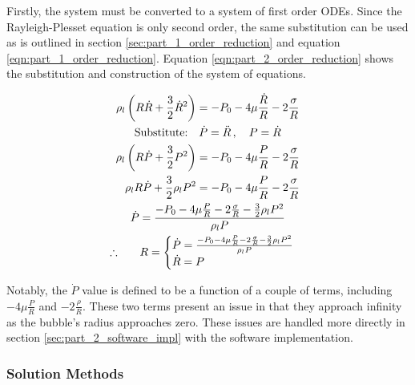 \documentclass[12pt]{article}
\begin{document}
Firstly, the system must be converted to a system of first order ODEs. Since the Rayleigh-Plesset equation is only second order, the same substitution can be used as is outlined in section \ref{sec:part_1_order_reduction} and equation \ref{eqn:part_1_order_reduction}. Equation \ref{eqn:part_2_order_reduction} shows the substitution and construction of the system of equations.

\begin{subequations}
    \label{eqn:part_2_order_reduction}
    \centering
    \begin{gather}
        \rho_l \left(R \dot R + \frac{3}{2}\dot R^2\right) = -P_0 -4 \mu \frac{\dot R}{R} - 2 \frac{\sigma}{R} \\
        \text{Substitute:} \quad \dot P = \ddot R \, , \quad P = \dot R\\
        \begin{aligned}
            \rho_l \left(R \dot P + \frac{3}{2}P^2\right) &= -P_0 - 4 \mu \frac{P}{R} - 2 \frac{\sigma}{R} \notag \\
            \rho_l R \dot P + \frac{3}{2} \rho_l P^2 &= -P_0 - 4 \mu \frac{P}{R} - 2 \frac{\sigma}{R} \notag
        \end{aligned}\\
        \dot P = \frac{-P_0 - 4 \mu \frac{P}{R} - 2 \frac{\sigma}{R} - \frac{3}{2}\rho_l P^2}{\rho_l P} \notag \\
        {\large\therefore} \qquad R =
        \begin{cases}
            \dot P = \frac{-P_0 - 4 \mu \frac{P}{R} - 2 \frac{\sigma}{R} - \frac{3}{2}\rho_l P^2}{\rho_l P} \\
            \dot R = P
        \end{cases} \label{eqn:part_2_order_reduction_system}
    \end{gather}
\end{subequations}

\noindent Notably, the $\dot P$ value is defined to be a function of a couple of terms, including $-4\mu \frac{P}{R}$ and $-2 \frac{\rho}{R}$. These two terms present an issue in that they approach infinity as the bubble's radius approaches zero. These issues are handled more directly in section \ref{sec:part_2_software_impl} with the software implementation. 

\subsubsection{Solution Methods}
\end{document}
